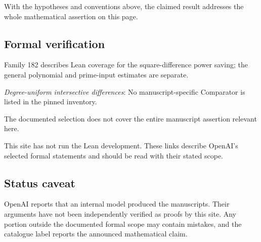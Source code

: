 \documentclass[11pt]{article}
\begin{document}
With the hypotheses and conventions above, the claimed result addresses the whole mathematical assertion on this page.

\subsection{Formal verification}
Family 182 describes Lean coverage for the square-difference power saving; the general polynomial and prime-input estimates are separate.

\textit{Degree-uniform intersective differences}: No manuscript-specific Comparator is listed in the pinned inventory.

The documented selection does not cover the entire manuscript assertion relevant here.

This site has not run the Lean development. These links describe OpenAI’s selected formal statements and should be read with their stated scope.

\subsection{Status caveat}
OpenAI reports that an internal model produced the manuscripts. Their arguments have not been independently verified as proofs by this site. Any portion outside the documented formal scope may contain mistakes, and the catalogue label reports the announced mathematical claim.
\end{document}
